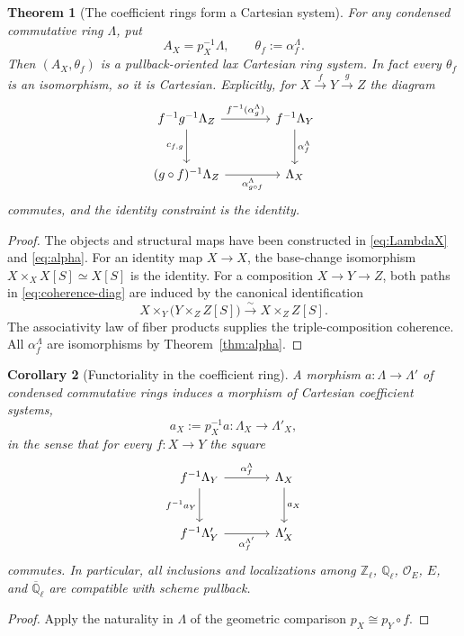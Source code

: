 \documentclass[11pt,a4paper]{article}
\numberwithin{equation}{section}
\newtheorem{theorem}{Theorem}[section]
\newtheorem{corollary}[theorem]{Corollary}
\theoremstyle{definition}
\theoremstyle{remark}
\newcommand{\OO}{\mathcal O}
\newcommand{\Qlbar}{\overline{\mathbb Q}_{\ell}}
\begin{document}
\begin{theorem}[The coefficient rings form a Cartesian system]
\label{thm:cart-section}
For any condensed commutative ring $\Lambda$, put
\[
       A_X=p_X^{-1}\Lambda,
       \qquad \theta_f:=\alpha_f^\Lambda.
\]
Then $(A_X,\theta_f)$ is a pullback-oriented lax Cartesian ring system.
In fact every $\theta_f$ is an isomorphism, so it is Cartesian.
Explicitly, for $X\xrightarrow fY\xrightarrow gZ$ the diagram
\begin{equation}\label{eq:coherence-diag}
\begin{tikzcd}[column sep=large,row sep=large]
 f^{-1}g^{-1}\Lambda_Z
    \arrow[r,"f^{-1}(\alpha_g^\Lambda)"]
    \arrow[d,"c_{f,g}"']
  & f^{-1}\Lambda_Y \arrow[d,"\alpha_f^\Lambda"]\\
 (g\circ f)^{-1}\Lambda_Z
    \arrow[r,"\alpha_{g\circ f}^\Lambda"']
  & \Lambda_X
\end{tikzcd}
\end{equation}
commutes, and the identity constraint is the identity.
\end{theorem}
\begin{proof}
The objects and structural maps have been constructed in
\eqref{eq:LambdaX} and \eqref{eq:alpha}.  For an identity map $X\to X$,
the base-change isomorphism $X\times_XX[S]\simeq X[S]$ is the identity.
For a composition $X\to Y\to Z$, both paths in
\eqref{eq:coherence-diag} are induced by the canonical identification
\[
 X\times_Y\bigl(Y\times_Z Z[S]\bigr)
                   \xrightarrow{\sim}X\times_ZZ[S].
\]
The associativity law of fiber products supplies the triple-composition
coherence.  All $\alpha_f^\Lambda$ are isomorphisms by
Theorem~\ref{thm:alpha}.
\end{proof}

\begin{corollary}[Functoriality in the coefficient ring]
\label{cor:coeff-functor}
A morphism $a:\Lambda\to\Lambda'$ of condensed commutative rings
induces a morphism of Cartesian coefficient systems,
\[
       a_X:=p_X^{-1}a:\Lambda_X\longrightarrow\Lambda'_X,
\]
in the sense that for every $f:X\to Y$ the square
\begin{equation}\label{eq:coeff-square}
\begin{tikzcd}[column sep=large,row sep=large]
 f^{-1}\Lambda_Y \arrow[r,"\alpha_f^\Lambda"]
                \arrow[d,"f^{-1}a_Y"']
       & \Lambda_X \arrow[d,"a_X"]\\
 f^{-1}\Lambda'_Y \arrow[r,"\alpha_f^{\Lambda'}"']
       & \Lambda'_X
\end{tikzcd}
\end{equation}
commutes.  In particular, all inclusions and localizations among
$\mathbb Z_\ell$, $\mathbb Q_\ell$, $\OO_E$, $E$, and $\Qlbar$
are compatible with scheme pullback.
\end{corollary}
\begin{proof}
Apply the naturality in $\Lambda$ of the geometric comparison
$p_X\cong p_Y\circ f$.
\end{proof}
\end{document}
